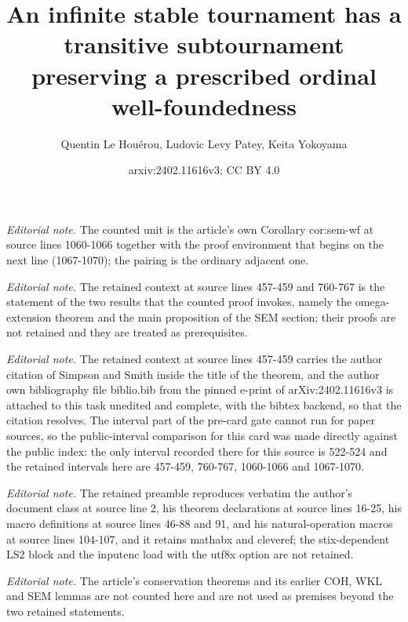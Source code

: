 \documentclass{article}
\title{An infinite stable tournament has a transitive subtournament preserving a prescribed ordinal well-foundedness}
\author{Quentin Le Houérou, Ludovic Levy Patey, Keita Yokoyama}
\date{arxiv:2402.11616v3; CC BY 4.0}
\numberwithin{theorem}{section}
\begin{document}
\maketitle
\noindent\textit{Editorial note.} The counted unit is the article's own Corollary cor:sem-wf at source lines 1060-1066 together with the proof environment that begins on the next line (1067-1070); the pairing is the ordinary adjacent one.\par\medskip
\noindent\textit{Editorial note.} The retained context at source lines 457-459 and 760-767 is the statement of the two results that the counted proof invokes, namely the omega-extension theorem and the main proposition of the SEM section; their proofs are not retained and they are treated as prerequisites.\par\medskip
\noindent\textit{Editorial note.} The retained context at source lines 457-459 carries the author citation of Simpson and Smith inside the title of the theorem, and the author own bibliography file biblio.bib from the pinned e-print of arXiv:2402.11616v3 is attached to this task unedited and complete, with the bibtex backend, so that the citation resolves. The interval part of the pre-card gate cannot run for paper sources, so the public-interval comparison for this card was made directly against the public index: the only interval recorded there for this source is 522-524 and the retained intervals here are 457-459, 760-767, 1060-1066 and 1067-1070.\par\medskip
\noindent\textit{Editorial note.} The retained preamble reproduces verbatim the author's document class at source line 2, his theorem declarations at source lines 16-25, his macro definitions at source lines 46-88 and 91, and his natural-operation macros at source lines 104-107, and it retains mathabx and cleveref; the stix-dependent LS2 block and the inputenc load with the utf8x option are not retained.\par\medskip
\noindent\textit{Editorial note.} The article's conservation theorems and its earlier COH, WKL and SEM lemmas are not counted here and are not used as premises beyond the two retained statements.\par\medskip
\end{document}
